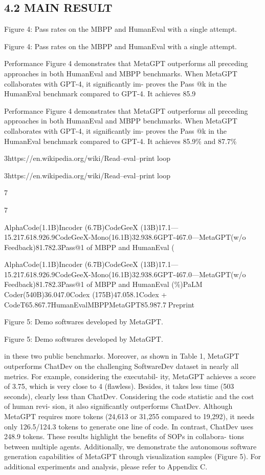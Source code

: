 \documentclass[12pt]{article}
\begin{document}
\subsection{4.2 MAIN RESULT}


Figure 4: Pass rates on the MBPP and HumanEval with a single attempt.


Figure 4: Pass rates on the MBPP and HumanEval with a single attempt.


Performance Figure 4 demonstrates that MetaGPT outperforms all preceding approaches in both
HumanEval and MBPP benchmarks. When MetaGPT collaborates with GPT-4, it significantly im-
proves the Pass @k in the HumanEval benchmark compared to GPT-4. It achieves 85.9%


Performance Figure 4 demonstrates that MetaGPT outperforms all preceding approaches in both
HumanEval and MBPP benchmarks. When MetaGPT collaborates with GPT-4, it significantly im-
proves the Pass @k in the HumanEval benchmark compared to GPT-4. It achieves 85.9\% and 87.7\%


3https://en.wikipedia.org/wiki/Read–eval–print loop


3https://en.wikipedia.org/wiki/Read–eval–print loop


7


7


AlphaCode(1.1B)Incoder (6.7B)CodeGeeX (13B)17.1—15.217.618.926.9CodeGeeX-Mono(16.1B)32.938.6GPT-467.0—MetaGPT(w/o Feedback)81.782.3Pass@1 of MBPP and HumanEval (%


AlphaCode(1.1B)Incoder (6.7B)CodeGeeX (13B)17.1—15.217.618.926.9CodeGeeX-Mono(16.1B)32.938.6GPT-467.0—MetaGPT(w/o Feedback)81.782.3Pass@1 of MBPP and HumanEval (\%)PaLM Coder(540B)36.047.0Codex (175B)47.058.1Codex + CodeT65.867.7HumanEvalMBPPMetaGPT85.987.7Preprint


Figure 5: Demo softwares developed by MetaGPT.


Figure 5: Demo softwares developed by MetaGPT.


in these two public benchmarks. Moreover, as shown in Table 1, MetaGPT outperforms ChatDev on
the challenging SoftwareDev dataset in nearly all metrics. For example, considering the executabil-
ity, MetaGPT achieves a score of 3.75, which is very close to 4 (flawless). Besides, it takes less time
(503 seconds), clearly less than ChatDev. Considering the code statistic and the cost of human revi-
sion, it also significantly outperforms ChatDev. Although MetaGPT requires more tokens (24,613
or 31,255 compared to 19,292), it needs only 126.5/124.3 tokens to generate one line of code. In
contrast, ChatDev uses 248.9 tokens. These results highlight the benefits of SOPs in collabora-
tions between multiple agents. Additionally, we demonstrate the autonomous software generation
capabilities of MetaGPT through visualization samples (Figure 5). For additional experiments and
analysis, please refer to Appendix C.
\end{document}
